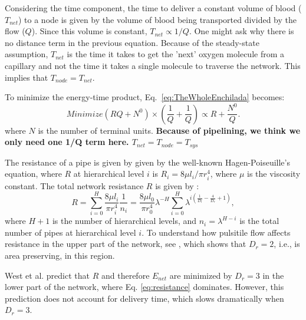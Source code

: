 \documentclass[12pt]{article}
\begin{document}
Considering the time component, the time to deliver a constant volume
of blood ($T_{net}$) to a node 
is given by the volume of blood being transported divided by the 
flow ($Q$).  Since this volume is constant, $T_{net}\propto 
1/Q$.  One might ask why there is no distance term in the previous
equation.  Because of the steady-state assumption, $T_{net}$ is the time it
takes to get the 'next' oxygen molecule from a capillary and not the time it
takes a single molecule to traverse the network.
This implies that $T_{node} = T_{net}$.

To minimize the energy-time product, Eq.~\ref{eq:TheWholeEnchilada}
becomes:
\begin{equation}
 Minimize (RQ + N^0) \times (\frac{1}{Q} + \frac{1}{Q}) \propto R +
 \frac{N^0}{Q}.
\label{eq:bio-min}
\end{equation}
\noindent where $N$ is the number of terminal units.  {\bf Because of
  pipelining, we think we only need one 1/Q term here.  $T_{net} = T_{node}
  = T_{sys}$}

The resistance of a pipe is given by given by the
well-known Hagen-Poiseuille's equation, where $R$
at hierarchical level $i$ is $R_i = 8\mu l_i/\pi r_i^4$, where $\mu$ is 
the viscosity constant.  The total network resistance $R$ is given by 
\cite{west97}:
\begin{equation}
\label{eq:resistance}
R = \sum_{i=0}^H \frac{8\mu l_i}{\pi r_i^4}\frac{1}{n_i}
= \frac{8\mu l_0}{\pi r_0^4} \lambda^{-H}\sum_{i=0}^H \lambda^{i 
\left(\frac{1}{D_l} - \frac{4}{D_r} + 1 \right)},
\end{equation}
where $H+1$ is the number of hierarchical levels, and $n_i =
\lambda^{H-i}$ is the total number of pipes at hierarchical level $i$.  
To understand how pulsitile flow affects resistance in the
  upper part of the network, see \cite{west97}, which shows that $D_r
  = 2$, i.e., is area preserving, in this region.

West et al. predict that $R$ and therefore $E_{net}$ are
minimized by $D_r = 3$ in the lower part of the
network,  where Eq. \ref{eq:resistance} dominates.  However, this
prediction does not account for delivery time, which slows
dramatically when $D_r = 3$.
\end{document}
